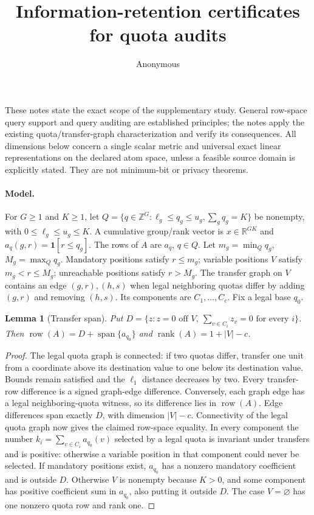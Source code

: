 \documentclass[10pt]{article}
\title{Information-retention certificates for quota audits}
\author{Anonymous}
\date{}
\newtheorem{lemma}{Lemma}
\newcommand{\row}{\operatorname{row}}
\newcommand{\rank}{\operatorname{rank}}
\begin{document}
\maketitle
\noindent These notes state the exact scope of the supplementary study. General
row-space query support and query auditing are established principles; the notes
apply the existing quota/transfer-graph characterization and verify its consequences.
All dimensions below concern a single scalar metric and universal exact linear
representations on the declared atom space, unless a feasible source domain is
explicitly stated. They are not minimum-bit or privacy theorems.

\paragraph{Model.}
For $G\geq1$ and $K\geq1$, let
$Q=\{q\in\mathbb Z^G:\ell_g\leq q_g\leq u_g,\sum_gq_g=K\}$ be nonempty,
with $0\leq\ell_g\leq u_g\leq K$. A cumulative group/rank vector is
$x\in\mathbb R^{GK}$ and $a_q(g,r)=\mathbf1[r\leq q_g]$.
The rows of $A$ are $a_q$, $q\in Q$. Let $m_g=\min_Qq_g$,
$M_g=\max_Qq_g$. Mandatory positions satisfy $r\leq m_g$; variable
positions $V$ satisfy $m_g<r\leq M_g$; unreachable positions satisfy $r>M_g$.
The transfer graph on $V$ contains an edge $(g,r),(h,s)$ when legal neighboring
quotas differ by adding $(g,r)$ and removing $(h,s)$. Its components are
$C_1,\ldots,C_c$. Fix a legal base $q_0$.

\begin{lemma}[Transfer span]
Put $D=\{z:z=0\text{ off }V,\ \sum_{v\in C_i}z_v=0\text{ for every }i\}$.
Then $\row(A)=D+\operatorname{span}\{a_{q_0}\}$ and
$\rank(A)=1+|V|-c$.
\end{lemma}
\begin{proof}
The legal quota graph is connected: if two quotas differ, transfer one unit
from a coordinate above its destination value to one below its destination
value. Bounds remain satisfied and the $\ell_1$ distance decreases by two.
Every transfer-row difference is a signed graph-edge difference. Conversely,
each graph edge has a legal neighboring-quota witness, so its difference lies
in $\row(A)$. Edge differences span exactly $D$, with dimension $|V|-c$.
Connectivity of the legal quota graph now gives the claimed row-space equality.
In every component the number $k_i=\sum_{v\in C_i}a_{q_0}(v)$ selected by a
legal quota is invariant under transfers and is positive: otherwise a variable
position in that component could never be selected. If mandatory positions
exist, $a_{q_0}$ has a nonzero mandatory coefficient and is outside $D$.
Otherwise $V$ is nonempty because $K>0$, and some component has positive
coefficient sum in $a_{q_0}$, also putting it outside $D$. The case $V=\varnothing$
has one nonzero quota row and rank one.
\end{proof}
\end{document}
